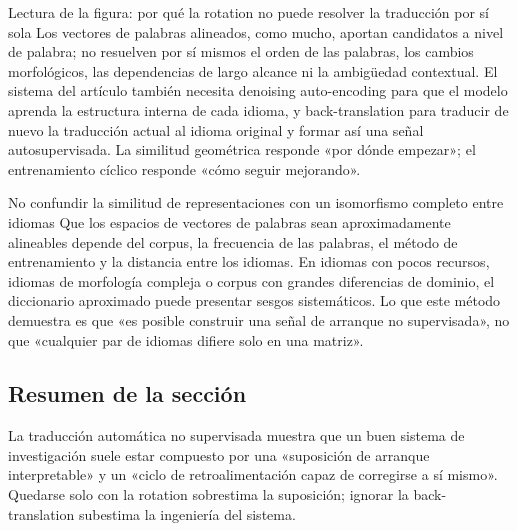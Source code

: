 \begin{knowledgebox}{Lectura de la figura: por qué la rotation no puede resolver la traducción por sí sola}
Los vectores de palabras alineados, como mucho, aportan candidatos a nivel de palabra; no resuelven por sí mismos el orden de las palabras, los cambios morfológicos, las dependencias de largo alcance ni la ambigüedad contextual. El sistema del artículo también necesita denoising auto-encoding para que el modelo aprenda la estructura interna de cada idioma, y back-translation para traducir de nuevo la traducción actual al idioma original y formar así una señal autosupervisada. La similitud geométrica responde «por dónde empezar»; el entrenamiento cíclico responde «cómo seguir mejorando».
\end{knowledgebox}

\begin{warningbox}{No confundir la similitud de representaciones con un isomorfismo completo entre idiomas}
Que los espacios de vectores de palabras sean aproximadamente alineables depende del corpus, la frecuencia de las palabras, el método de entrenamiento y la distancia entre los idiomas. En idiomas con pocos recursos, idiomas de morfología compleja o corpus con grandes diferencias de dominio, el diccionario aproximado puede presentar sesgos sistemáticos. Lo que este método demuestra es que «es posible construir una señal de arranque no supervisada», no que «cualquier par de idiomas difiere solo en una matriz».
\end{warningbox}


\subsection{Resumen de la sección}

La traducción automática no supervisada muestra que un buen sistema de investigación suele estar compuesto por una «suposición de arranque interpretable» y un «ciclo de retroalimentación capaz de corregirse a sí mismo». Quedarse solo con la rotation sobrestima la suposición; ignorar la back-translation subestima la ingeniería del sistema.
